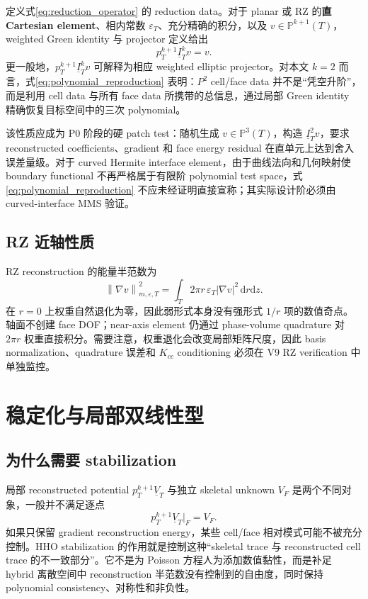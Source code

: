 \documentclass[UTF8,a4paper,11pt]{ctexart}
\newcommand{\Pp}{\mathbb{P}}
\newcommand{\dd}{\mathrm{d}}
\newcommand{\eps}{\varepsilon}
\newcommand{\norm}[1]{\left\lVert #1\right\rVert}
\begin{document}
定义式\eqref{eq:reduction_operator} 的 reduction data。对于 planar 或 RZ 的\textbf{直 Cartesian element}、相内常数 \(\eps_T\)、充分精确的积分，以及 \(v\in\Pp^{k+1}(T)\)，weighted Green identity 与 projector 定义给出
\begin{equation}
\boxed{
p_T^{k+1}\underline I_T^k v=v.}
\label{eq:polynomial_reproduction}
\end{equation}
更一般地，\(p_T^{k+1}\underline I_T^k v\) 可解释为相应 weighted elliptic projector。对本文 \(k=2\) 而言，式\eqref{eq:polynomial_reproduction} 表明：\(P^2\) cell/face data 并不是“凭空升阶”，而是利用 cell data 与所有 face data 所携带的总信息，通过局部 Green identity 精确恢复目标空间中的三次 polynomial。

该性质应成为 P0 阶段的硬 patch test：随机生成 \(v\in\Pp^3(T)\)，构造 \(\underline I_T^2v\)，要求 reconstructed coefficients、gradient 和 face energy residual 在直单元上达到舍入误差量级。对于 curved Hermite interface element，由于曲线法向和几何映射使 boundary functional 不再严格属于有限阶 polynomial test space，式\eqref{eq:polynomial_reproduction} 不应未经证明直接宣称；其实际设计阶必须由 curved-interface MMS 验证。

\subsection{RZ 近轴性质}

RZ reconstruction 的能量半范数为
\[
\norm{\nabla v}_{m,\eps,T}^2
=
\int_T2\pi r\,\eps_T|\nabla v|^2\,\dd r\dd z.
\]
在 \(r=0\) 上权重自然退化为零，因此弱形式本身没有强形式 \(1/r\) 项的数值奇点。轴面不创建 face DOF；near-axis element 仍通过 phase-volume quadrature 对 \(2\pi r\) 权重直接积分。需要注意，权重退化会改变局部矩阵尺度，因此 basis normalization、quadrature 误差和 \(K_{cc}\) conditioning 必须在 V9 RZ verification 中单独监控。

\section{稳定化与局部双线性型}
\label{sec:stabilization}

\subsection{为什么需要 stabilization}

局部 reconstructed potential \(p_T^{k+1}\underline V_T\) 与独立 skeletal unknown \(V_F\) 是两个不同对象，一般并不满足逐点
\[
p_T^{k+1}\underline V_T|_F=V_F.
\]
如果只保留 gradient reconstruction energy，某些 cell/face 相对模式可能不被充分控制。HHO stabilization 的作用就是控制这种“skeletal trace 与 reconstructed cell trace 的不一致部分”。它不是为 Poisson 方程人为添加数值黏性，而是补足 hybrid 离散空间中 reconstruction 半范数没有控制到的自由度，同时保持 polynomial consistency、对称性和非负性。
\end{document}
